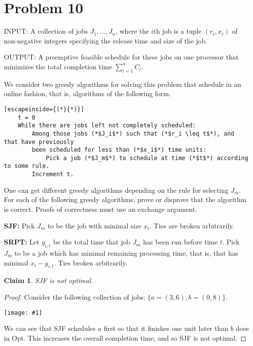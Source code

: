 \documentclass{article}
\newtheorem{thm}{Claim}
\providecommand{\prob}[1]{\section*{Problem #1}}
\providecommand{\image}[1]{
    \begin{center}
        \texttt{[image: \#1]}
    \end{center}
}
\begin{document}
    \pagebreak %
    \prob{10}
    INPUT: A collection of jobs $J_1, \dots, J_n$, where the $i$th job is a tuple $(r_i, x_i)$ of non-negative integers specifying the release time and size of the job.

    OUTPUT: A preemptive feasible schedule for these jobs on one processor that minimizes the total completion time $\sum_{i=1}^{n} C_i$.

    We consider two greedy algorithms for solving this problem that schedule in an online fashion, that is, algorithms of the following form.
    \begin{lstlisting}[escapeinside={(*}{*)}]
    t = 0
    While there are jobs left not completely scheduled:
        Among those jobs (*$J_i$*) such that (*$r_i \leq t$*), and that have previously
        been scheduled for less than (*$x_i$*) time units:
            Pick a job (*$J_m$*) to schedule at time (*$t$*) according to some rule.
        Increment t.
    \end{lstlisting}

    One can get different greedy algorithms depending on the rule for selecting $J_m$.
    For each of the following greedy algorithms, prove or disprove that the algorithm is correct.
    Proofs of correctness must use an exchange argument.

    \textbf{SJF:} Pick $J_m$ to be the job with minimal size $x_i$.
    Ties are broken arbitrarily.

    \textbf{SRPT:} Let $y_{i,t}$ be the total time that job $J_m$ has been run before time $t$.
    Pick $J_m$ to be a job which has minimal remaining processing time, that is, that has minimal $x_i - y_{i, t}$.
    Ties broken arbitrarily.


    \begin{thm}
        SJF is not optimal.
    \end{thm}
    \begin{proof}
        Consider the following collection of jobs: $\{ a=(3,6),b=(0,8) \}$.
        \image{p10atable}
        We can see that SJF schedules $a$ first so that it finishes one unit later than $b$ does in Opt.
        This increases the overall completion time, and so SJF is not optimal.
    \end{proof}
\end{document}
